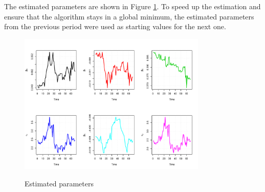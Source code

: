 The estimated parameters are shown in Figure \ref{fig:paramdevel}. To speed up the estimation and ensure that the algorithm stays in a global minimum, the estimated parameters from the previous period were used as starting values for the next one.

\begin{figure}[htb]
  \begin{center}
  \caption{Estimated parameters}
\includegraphics[width=0.8\textwidth]{paramdevel}
\label{fig:paramdevel}
\end{center}
\end{figure}




